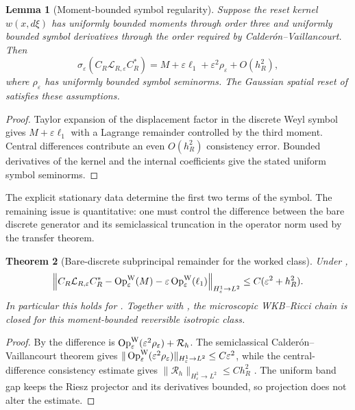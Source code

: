 \documentclass[11pt]{article}
\newtheorem{theorem}{Theorem}[section]
\newtheorem{lemma}[theorem]{Lemma}
\theoremstyle{definition}
\theoremstyle{remark}
\newcommand{\eps}{\varepsilon}
\begin{document}
\begin{lemma}[Moment-bounded symbol regularity]
\label{lem:worked-channel-regularity}
Suppose the reset kernel $w(x,d\xi)$ has uniformly bounded moments through order
three and uniformly bounded symbol derivatives through the order required by
Calder\'on--Vaillancourt.  Then
\[
 \sigma_\eps(C_R\mathcal L_{R,\eps}C_R^*)
 =M+\eps\ell_1+\eps^2\rho_\eps+O(h_R^2),
\]
where $\rho_\eps$ has uniformly bounded symbol seminorms.  The Gaussian spatial
reset of  satisfies these assumptions.
\end{lemma}

\begin{proof}
Taylor expansion of the displacement factor in the discrete Weyl symbol gives
$M+\eps\ell_1$ with a Lagrange remainder controlled by the third moment.  Central
differences contribute an even $O(h_R^2)$ consistency error.  Bounded derivatives
of the kernel and the internal coefficients give the stated uniform symbol
seminorms.
\end{proof}

The explicit stationary data determine the first two terms of the symbol.
The remaining issue is quantitative: one must control the difference between
the bare discrete generator and its semiclassical truncation in the operator
norm used by the transfer theorem.

\begin{theorem}[Bare-discrete subprincipal remainder for the worked class]
\label{thm:bare-discrete-remainder}
Under ,
\[
 \left\|C_R\mathcal L_{R,\eps}C_R^*
 -\operatorname{Op}^{\rm W}_\eps(M)
 -\eps\operatorname{Op}^{\rm W}_\eps(\ell_1)\right\|_{H^1_\eps\to L^2}
 \le C(\eps^2+h_R^2).
\]
In particular this holds for .  Together with
, the microscopic WKB--Ricci chain is closed for
this moment-bounded reversible isotropic class.
\end{theorem}

\begin{proof}
By  the difference is
$\operatorname{Op}^{\rm W}_\eps(\eps^2\rho_\eps)+\mathcal R_h$.
The semiclassical Calder\'on--Vaillancourt theorem gives
$\|\operatorname{Op}^{\rm W}_\eps(\eps^2\rho_\eps)\|_{H^1_\eps\to L^2}
\le C\eps^2$, while the central-difference consistency estimate gives
$\|\mathcal R_h\|_{H^1_\eps\to L^2}\le Ch_R^2$
\cite{DimassiSjostrand,Zworski}.  The uniform band gap keeps the Riesz projector
and its derivatives bounded, so projection does not alter the estimate.
\end{proof}
\end{document}
